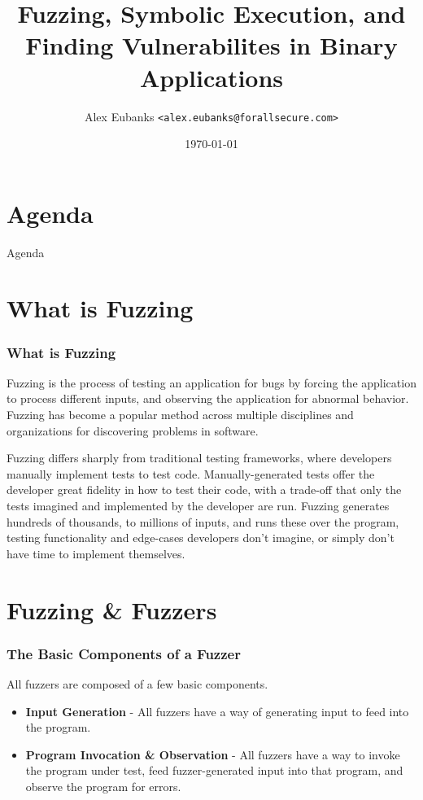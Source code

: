 \documentclass{beamer}
\title{Fuzzing, Symbolic Execution, and Finding Vulnerabilites in Binary Applications}
\date{\today}
\author[Eubanks]{Alex Eubanks \texttt{<alex.eubanks@forallsecure.com>}}
\begin{document}
\begin{frame}
\titlepage
\end{frame}

\section{Agenda}

\begin{frame}{Agenda}
\setlength{\parskip}{0cm}
\tableofcontents
\end{frame}

\section{What is Fuzzing}

\begin{frame}
\frametitle{What is Fuzzing}
Fuzzing is the process of testing an application for bugs by forcing the application to process different inputs, and observing the application for abnormal behavior. Fuzzing has become a popular method across multiple disciplines and organizations for discovering problems in software.
\par
Fuzzing differs sharply from traditional testing frameworks, where developers manually implement tests to test code. Manually-generated tests offer the developer great fidelity in how to test their code, with a trade-off that only the tests imagined and implemented by the developer are run. Fuzzing generates hundreds of thousands, to millions of inputs, and runs these over the program, testing functionality and edge-cases developers don't imagine, or simply don't have time to implement themselves.
\end{frame}

\section{Fuzzing {\&} Fuzzers}

\begin{frame}
\frametitle{The Basic Components of a Fuzzer}
All fuzzers are composed of a few basic components.

\begin{itemize}
  \item \textbf{Input Generation} - All fuzzers have a way of generating input to feed into the program.
  \item \textbf{Program Invocation \& Observation} - All fuzzers have a way to invoke the program under test, feed fuzzer-generated input into that program, and observe the program for errors.
\end{itemize}
\end{frame}
\end{document}
